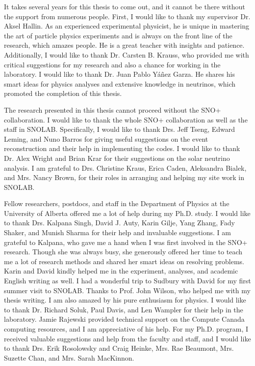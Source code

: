 It takes several years for this thesis to come out, and it cannot be there without the support from numerous people. First, I would like to thank my supervisor Dr. Aksel Hallin. As an experienced experimental physicist, he is unique in mastering the art of particle physics experiments and is always on the front line of the research, which amazes people. He is a great teacher with insights and patience. Additionally, I would like to thank Dr. Carsten B. Krauss, who provided me with critical suggestions for my research and also a chance for working in the laboratory. I would like to thank Dr. Juan Pablo Y\'{a}\~{n}ez Garza. He shares his smart ideas for physics analyses and extensive knowledge in neutrinos, which promoted the completion of this thesis.

The research presented in this thesis cannot proceed without the SNO+ collaboration. I would like to thank the whole SNO+ collaboration as well as the staff in SNOLAB. Specifically, I would like to thank Drs. Jeff Tseng, Edward Leming, and Nuno Barros for giving useful suggestions on the event reconstruction and their help in implementing the codes. I would like to thank Dr. Alex Wright and Brian Krar for their suggestions on the solar neutrino analysis. I am grateful to Drs. Christine Kraus, Erica Caden, Aleksandra Bialek, and Mrs. Nancy Brown, for their roles in arranging and helping my site work in SNOLAB.

Fellow researchers, postdocs, and staff in the Department of Physics at the University of Alberta offered me a lot of help during my Ph.D. study. I would like to thank Drs. Kalpana Singh, David J. Auty, Karin Gilje, Yang Zhang, Fady Shaker, and Munish Sharma for their help and invaluable suggestions. I am grateful to Kalpana, who gave me a hand when I was first involved in the SNO+ research. Though she was always busy, she generously offered her time to teach me a lot of research methods and shared her smart ideas on resolving problems. Karin and David kindly helped me in the experiment, analyses, and academic English writing as well. I had a wonderful trip to Sudbury with David for my first summer visit to SNOLAB. Thanks to Prof. John Wilson, who helped me with my thesis writing. I am also amazed by his pure enthusiasm for physics. I would like to thank Dr. Richard Soluk, Paul Davis, and Len Wampler for their help in the laboratory. Jamie Rajewski provided technical support on the Compute Canada computing resources, and I am appreciative of his help. For my Ph.D. program, I received valuable suggestions and help from the faculty and staff, and I would like to thank Drs. Erik Rosolowsky and Craig Heinke, Mrs. Rae Beaumont, Mrs. Suzette Chan, and Mrs. Sarah MacKinnon.


